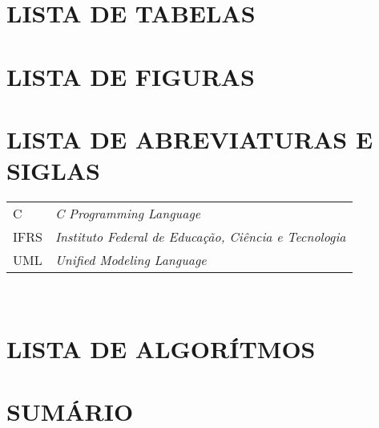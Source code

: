 \documentclass[12pt,a4paper]{article}
\begin{document}
	\section*{LISTA DE TABELAS}

	\listoftables

	\newpage

	\thispagestyle{empty}
	\section*{LISTA DE FIGURAS}

	\listoffigures

	\newpage


	\thispagestyle{empty}
	\section*{LISTA DE ABREVIATURAS E SIGLAS}

	\begin{tabular}{p{3cm} p{}}
	  C & \textit{C Programming Language} \\
	  IFRS & \textit{Instituto Federal de Educação, Ciência e Tecnologia} \\
	  UML & \textit{Unified Modeling Language} \\
	\end{tabular}\\


	\newpage


	\thispagestyle{empty}
	\section*{LISTA DE ALGORÍTMOS}


	\newpage



	\thispagestyle{empty}
	\section*{SUMÁRIO}
\end{document}
